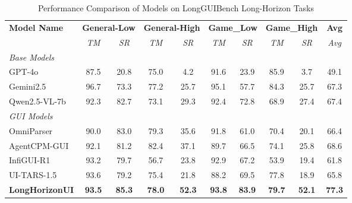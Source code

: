 \documentclass{article} %
\begin{document}
\begin{table}[!t]
\centering
\caption{Performance Comparison of Models on LongGUIBench Long-Horizon Tasks}
\label{tab:longHorizon_performance}
\footnotesize %
\setlength{\tabcolsep}{4pt} %
\begin{tabular}{lccccccccc}
\toprule
\textbf{Model Name} &
\multicolumn{2}{c}{\textbf{General-Low}} &
\multicolumn{2}{c}{\textbf{General-High}} &
\multicolumn{2}{c}{\textbf{Game\_Low}} &
\multicolumn{2}{c}{\textbf{Game\_High}} &
\textbf{Avg} \\
\cmidrule(lr){2-3} \cmidrule(lr){4-5} \cmidrule(lr){6-7} \cmidrule(lr){8-9}
& \textit{TM} & \textit{SR} & \textit{TM} & \textit{SR} & \textit{TM} & \textit{SR} & \textit{TM} & \textit{SR} & \textit{Avg} \\
\midrule
\multicolumn{10}{l}{\emph{Base Models}} \\
\midrule
GPT-4o \citep{openai2024gpt4technicalreport} & 87.5 & 20.8 & 75.0 & 4.2 & 91.6 & 23.9 & 85.9 & 3.7 & 49.1 \\
Gemini2.5 \citep{comanici2025gemini}        & 96.7 & 73.3 & 77.2 & 25.7 & 95.1 & 57.7 & 84.3 & 25.7 & 67.3 \\
Qwen2.5-VL-7b \citep{Qwen2.5-VL}            & 92.3 & 82.7 & 73.1 & 29.3 & 92.4 & 72.8 & 68.9 & 27.4 & 67.4 \\
\midrule
\multicolumn{10}{l}{\emph{GUI Models}} \\
\midrule
OmniParser \citep{lu2024omniparserpurevisionbased}    & 90.0 & 83.0 & 79.3 & 35.6 & 91.8 & 61.0 & 70.4 & 20.1 & 66.4 \\
AgentCPM-GUI \citep{zhang2025_agentcpm}               & 92.1 & 81.2 & 82.4 & 37.1 & 89.7 & 66.5 & 74.1 & 25.8 & 68.6 \\
InfiGUI-R1 \citep{liu2025_infiguir1}                  & 93.2 & 79.7 & 56.7 & 23.8 & 92.9 & 67.2 & 53.9 & 19.4 & 61.8 \\
UI-TARS-1.5 \citep{qin2025_uitars}                    & 93.6 & 79.2 & 75.4 & 21.8 & 88.2 & 69.5 & 77.8 & 18.9 & 65.8 \\
\midrule
\rowcolor{black!4}
\textbf{LongHorizonUI} & \textbf{93.5} & \textbf{85.3} & \textbf{78.0} & \textbf{52.3} & \textbf{93.8} & \textbf{83.9} & \textbf{79.7} & \textbf{52.1} & \textbf{77.3} \\
\bottomrule
\end{tabular}
\end{table}
\end{document}
